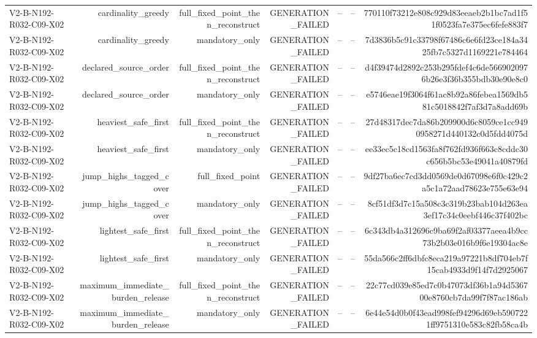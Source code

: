 {\begin{longtable}{lrrrrrr}
V2-B-N192-R032-C09-X02 & cardinality\_greedy & full\_fixed\_point\_then\_reconstruct & GENERATION\_FAILED & -- & -- & 770110f73212e808c929d83eeaeb2b1bc7ad1f51f0523fa7e375ec6fefe883f7 \\
V2-B-N192-R032-C09-X02 & cardinality\_greedy & mandatory\_only & GENERATION\_FAILED & -- & -- & 7d3836b5c91c33798f67486c6e6fd23ce184a3425fb7c5327d1169221e784464 \\
V2-B-N192-R032-C09-X02 & declared\_source\_order & full\_fixed\_point\_then\_reconstruct & GENERATION\_FAILED & -- & -- & d4f39474d2892c253b295fdef4c6de5669020976b26e3f36b355bdb30e90e8c0 \\
V2-B-N192-R032-C09-X02 & declared\_source\_order & mandatory\_only & GENERATION\_FAILED & -- & -- & e5746eae19f3064f61ac8b92a86febea1569db581c5018842f7af3d7a8add69b \\
V2-B-N192-R032-C09-X02 & heaviest\_safe\_first & full\_fixed\_point\_then\_reconstruct & GENERATION\_FAILED & -- & -- & 27d48317dec7da86b209900d6c8059ce1cc9490958271d440132c0d5fdd4075d \\
V2-B-N192-R032-C09-X02 & heaviest\_safe\_first & mandatory\_only & GENERATION\_FAILED & -- & -- & ee33ec5c18cd1563fa8f762fd936f663c8cddc30c656b5bc53e49041a40879fd \\
V2-B-N192-R032-C09-X02 & jump\_highs\_tagged\_cover & full\_fixed\_point & GENERATION\_FAILED & -- & -- & 9df27ba6ec7cd3dd0569de0d67098e6f0c429c2a5c1a72aad78623e755e63e94 \\
V2-B-N192-R032-C09-X02 & jump\_highs\_tagged\_cover & mandatory\_only & GENERATION\_FAILED & -- & -- & 8cf51df3d7c15a508c3c319b23bab104d263ea3ef17c34c0eebf446c37f402bc \\
V2-B-N192-R032-C09-X02 & lightest\_safe\_first & full\_fixed\_point\_then\_reconstruct & GENERATION\_FAILED & -- & -- & 6c343db4a312696c9ba69f2af03377aeea4b9cc73b2b03e016b9f6e19304ac8e \\
V2-B-N192-R032-C09-X02 & lightest\_safe\_first & mandatory\_only & GENERATION\_FAILED & -- & -- & 55da566c2ff6dbfc8eca219a97221b8df704eb7f15cab4933d9f14f7d2925067 \\
V2-B-N192-R032-C09-X02 & maximum\_immediate\_burden\_release & full\_fixed\_point\_then\_reconstruct & GENERATION\_FAILED & -- & -- & 22c77cd039e85ed7c0b47073df36b1a94d536700e8760cb7da99f7f87ac186ab \\
V2-B-N192-R032-C09-X02 & maximum\_immediate\_burden\_release & mandatory\_only & GENERATION\_FAILED & -- & -- & 6e44e54d0b0f43ead998fef94296d69eb5907221ff9751310e583c82fb58ca4b \\

\end{longtable}}
